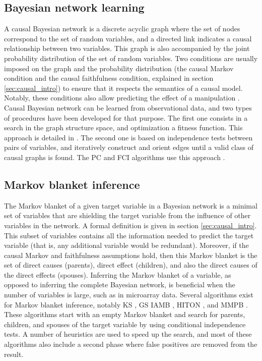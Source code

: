 \subsection{Bayesian network learning}

A causal Bayesian network is a discrete acyclic graph where the set of nodes
correspond to the set of random variables, and a directed link indicates a
causal relationship between two variables. This graph is also accompanied by the
joint probability distribution of the set of random variables. Two conditions
are usually imposed on the graph and the probability distribution (the causal
Markov condition and the causal faithfulness condition, explained in section
\ref{sec:causal_intro}) to ensure that it respects the semantics of a causal
model. Notably, these conditions also allow predicting the effect of a
manipulation \parencite{spirtes2010introduction}. Causal Bayesian network can be
learned from observational data, and two types of procedures have been developed
for that purpose. The first one consists in a search in the graph structure
space, and optimization a fitness function. This approach is detailed in
\parencite{heckerman1998tutorial}. The second one is based on independence tests
between pairs of variables, and iteratively construct and orient edges until a
valid class of causal graphs is found. The PC and FCI algorithms use this
approach \parencite{spirtes1993causation}.

\subsection{Markov blanket inference}

The Markov blanket of a given target variable in a Bayesian network is a minimal
set of variables that are shielding the target variable from the influence of
other variables in the network. A formal definition is given in section
\ref{sec:causal_intro}. This subset of variables contains all the information
needed to predict the target variable (that is, any additional variable would be
redundant). Moreover, if the causal Markov and faithfulness assumptions hold,
then this Markov blanket is the set of direct causes (parents), direct effect
(children), and also the direct causes of the direct effects (spouses).
Inferring the Markov blanket of a variable, as opposed to inferring the complete
Bayesian network, is beneficial when the number of variables is large, such as
in microarray data. Several algorithms exist for Markov blanket inference,
notably KS \parencite{koller1996towards}, GS \parencite{margaritis2000bayesian}
IAMB \parencite{tsamardinos2003time}, HITON \parencite{aliferis2003hiton}, and
MMPB \parencite{tsamardinos2003time}. These algorithms start with an empty
Markov blanket and search for parents, children, and spouses of the target
variable by using conditional independence tests. A number of heuristics are
used to speed up the search, and most of these algorithms also include a second
phase where false positives are removed from the result.

